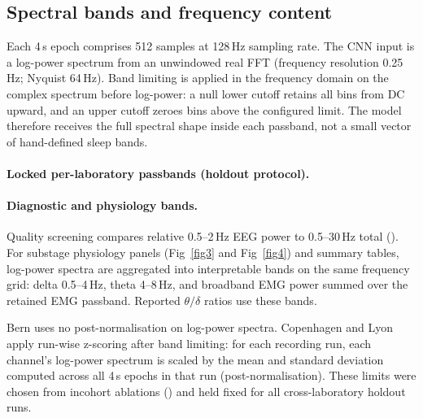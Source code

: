 \subsection{Spectral bands and frequency content}
\label{app:data:bands}

Each 4\,s epoch comprises 512 samples at 128\,Hz sampling rate.
The CNN input is a log-power spectrum from an unwindowed real FFT (frequency resolution 0.25\,Hz; Nyquist 64\,Hz).
Band limiting is applied in the frequency domain on the complex spectrum before log-power: a null lower cutoff retains all bins from DC upward, and an upper cutoff zeroes bins above the configured limit.
The model therefore receives the full spectral shape inside each passband, not a small vector of hand-defined sleep bands.

\paragraph*{Locked per-laboratory passbands (holdout protocol).}

\paragraph*{Diagnostic and physiology bands.}
Quality screening compares relative 0.5--2\,Hz EEG power to 0.5--30\,Hz total ().
For substage physiology panels (Fig~\ref{fig3} and Fig~\ref{fig4}) and summary tables, log-power spectra are aggregated into interpretable bands on the same frequency grid:
delta 0.5--4\,Hz, theta 4--8\,Hz, and broadband EMG power summed over the retained EMG passband.
Reported $\theta/\delta$ ratios use these bands.

Bern uses no post-normalisation on log-power spectra.
Copenhagen and Lyon apply run-wise z-scoring after band limiting: for each recording run, each channel's log-power spectrum is scaled by the mean and standard deviation computed across all 4\,s epochs in that run (post-normalisation).
These limits were chosen from incohort ablations () and held fixed for all cross-laboratory holdout runs.

